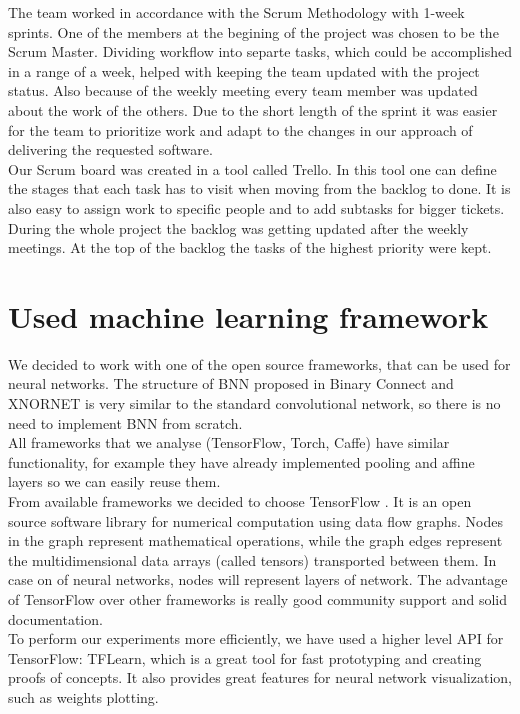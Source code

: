 \documentclass[licencjacka]{pracamgr}
\begin{document}
	The team worked in accordance with the Scrum Methodology with 1-week sprints. One of the members at the begining of the project was chosen to be the Scrum Master. Dividing workflow into separte tasks, which could be accomplished in a range of a week, helped with keeping the team updated with the project status. Also because of the weekly meeting every team member was updated about the work of the others. Due to the short length of the sprint it was easier for the team to prioritize work and adapt to the changes in our approach of delivering the requested software.
\\
	Our Scrum board was created in a tool called Trello. In this tool one can define the stages that each task has to visit when moving from the backlog to done. It is also easy to assign work to specific people and to add subtasks for bigger tickets. During the whole project the backlog was getting updated after the weekly meetings. At the top of the backlog the tasks of the highest priority were kept.

	\section{Used machine learning framework}

		We decided to work with one of the open source frameworks, that can be used for neural networks. The structure of BNN proposed in Binary Connect \cite{binaryConnect} and XNORNET \cite{xnornet} is very similar to the standard convolutional network, so there is no need to implement BNN from scratch. 
		\\
		All frameworks that we analyse (TensorFlow, Torch, Caffe) have similar functionality, for example they have already implemented pooling and affine layers so we can easily reuse them. 
\\
		From available frameworks we decided to choose TensorFlow \cite{tensorFlow}. It is an open source software library for numerical computation using data flow graphs. Nodes in the graph represent mathematical operations, while the graph edges represent the multidimensional data arrays (called tensors) transported between them. In case on of neural networks, nodes will represent layers of network. 
		The advantage of TensorFlow over other frameworks is really good community support and solid documentation.
\\		
		To perform our experiments more efficiently, we have used a higher level API for TensorFlow: TFLearn, which is a great tool for fast prototyping and creating proofs of concepts. It also provides great features for neural network visualization, such as weights plotting.
\end{document}
